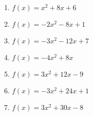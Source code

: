 \documentclass{article}%
\begin{document}
\begin{enumerate}[label=\alph*)]
\item%
\newline\vspace{0.5cm} $f(x)=x^2 + 8x + 6$%
\item%
\newline\vspace{0.5cm} $f(x)=-2x^2 - 8x + 1$%
\item%
\newline\vspace{0.5cm} $f(x)=-3x^2 - 12x + 7$%
\item%
\newline\vspace{0.5cm} $f(x)=-4x^2 + 8x$%
\item%
\newline\vspace{0.5cm} $f(x)=3x^2 + 12x - 9$%
\item%
\newline\vspace{0.5cm} $f(x)=-3x^2 + 24x + 1$%
\item%
\newline\vspace{0.5cm} $f(x)=3x^2 + 30x - 8$%
\end{enumerate}

%
\end{document}
